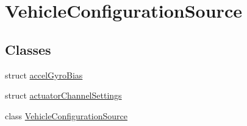 \hypertarget{group___vehicle_configuration_source}{\section{\-Vehicle\-Configuration\-Source}
\label{group___vehicle_configuration_source}
}
\subsection*{\-Classes}
\begin{DoxyCompactItemize}
\item 
struct \hyperlink{structaccel_gyro_bias}{accel\-Gyro\-Bias}
\item 
struct \hyperlink{structactuator_channel_settings}{actuator\-Channel\-Settings}
\item 
class \hyperlink{class_vehicle_configuration_source}{\-Vehicle\-Configuration\-Source}
\end{DoxyCompactItemize}

